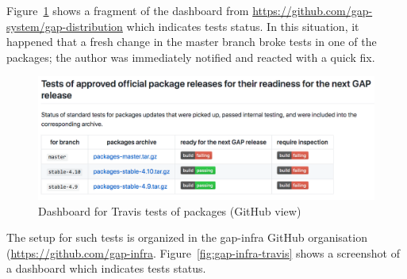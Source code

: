 Figure~\ref{fig:gap-docker-pkg-tests} shows a fragment of the dashboard
from \url{https://github.com/gap-system/gap-distribution} which 
indicates tests status. In this situation, it happened that a fresh
change in the master branch broke tests in one of the packages;
the author was immediately notified and reacted with a quick fix.


\begin{figure}[!ht]
    \centering
    \includegraphics[width=\textwidth]{images/gap-docker-pkg-tests}
    \caption{Dashboard for Travis tests of \GAP packages (GitHub view)}
    \label{fig:gap-docker-pkg-tests}
\end{figure}


The setup for such tests is organized in the gap-infra GitHub organisation
(\url{https://github.com/gap-infra}. Figure~\ref{fig:gap-infra-travis} shows a 
screenshot of a dashboard which indicates tests status.


